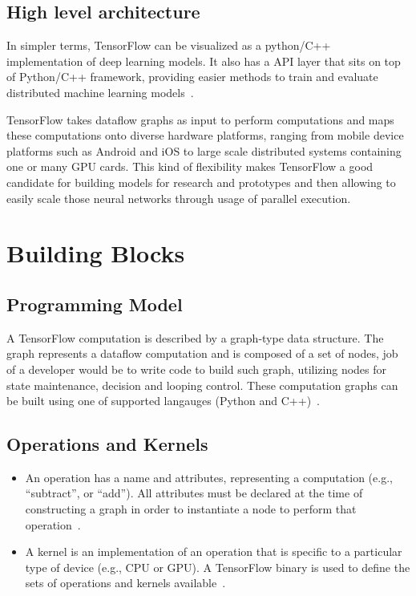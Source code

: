 \subsection{High level architecture}
In simpler terms, TensorFlow can be visualized as a python/C++
implementation of deep learning models. It also has a API layer that
sits on top of Python/C++ framework, providing easier methods to train
and evaluate distributed machine learning
models~\cite{hid-sp18-510-tfblog}. 

TensorFlow takes dataflow graphs as input to perform computations and
maps these computations onto diverse hardware platforms, ranging from
mobile device platforms such as Android and iOS to large scale
distributed systems containing one or many GPU cards. This kind of
flexibility makes TensorFlow a good candidate for building models for
research and prototypes and then allowing to easily scale those neural
networks through usage of parallel execution. 


\section{Building Blocks}
\subsection{Programming Model}
A TensorFlow computation is described by a graph-type data structure.
The graph represents a dataflow computation and is composed of a set
of nodes, job of a developer would be to write code to build such
graph, utilizing nodes for state maintenance, decision and looping
control. These computation graphs can be built using one of supported
langauges (Python and
C++)~\cite{hid-sp18-510-tensorflow2015-whitepaper}.   

\subsection{Operations and Kernels}
\begin{itemize}
	\item An operation has a name and attributes, representing a
computation (e.g., “subtract”, or “add”). All attributes must be
declared at the time of constructing a graph in order to instantiate a
node to perform that
operation~\cite{hid-sp18-510-tensorflow2015-whitepaper}. 
\item A kernel is an implementation of an operation that is specific to a
particular type of device (e.g., CPU or GPU). A TensorFlow binary is
used to define the sets of operations and kernels
available~\cite{hid-sp18-510-tensorflow2015-whitepaper}.
\end{itemize}
